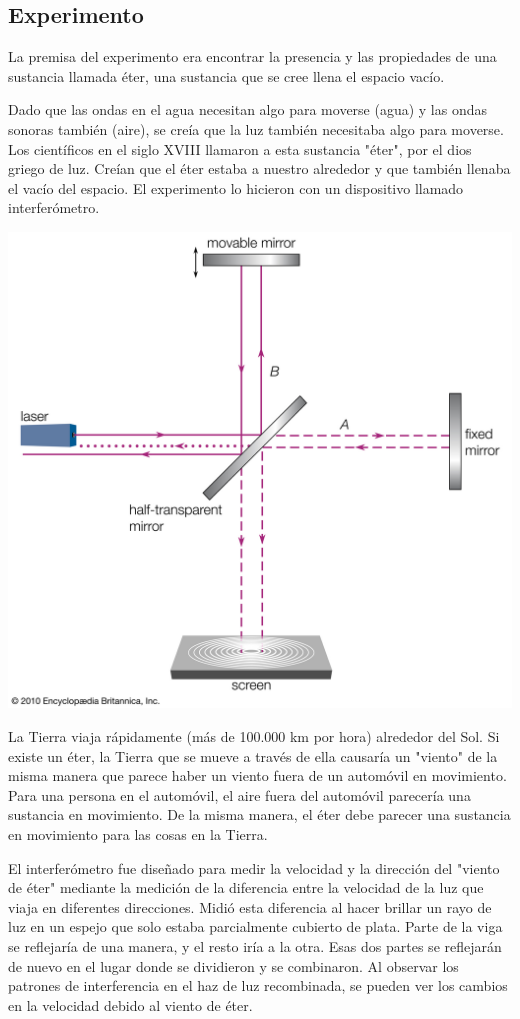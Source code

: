 \documentclass[letterpaper, 10pt, journal]{IEEEtran}
\begin{document}
\subsection{Experimento}
La premisa del experimento era encontrar la presencia y las propiedades de una sustancia llamada éter, una sustancia que se cree llena el espacio vacío. 

Dado que las ondas en el agua necesitan algo para moverse (agua) y las ondas sonoras también (aire), se creía que la luz también necesitaba algo para moverse. Los científicos en el siglo XVIII llamaron a esta sustancia "éter", por el dios griego de luz. Creían que el éter estaba a nuestro alrededor y que también llenaba el vacío del espacio. El experimento lo hicieron con un dispositivo llamado interferómetro.

\includegraphics[scale=0.15]{luz}

La Tierra viaja rápidamente (más de 100.000 km por hora) alrededor del Sol. Si existe un éter, la Tierra que se mueve a través de ella causaría un "viento" de la misma manera que parece haber un viento fuera de un automóvil en movimiento. Para una persona en el automóvil, el aire fuera del automóvil parecería una sustancia en movimiento. De la misma manera, el éter debe parecer una sustancia en movimiento para las cosas en la Tierra.

El interferómetro fue diseñado para medir la velocidad y la dirección del "viento de éter" mediante la medición de la diferencia entre la velocidad de la luz que viaja en diferentes direcciones. Midió esta diferencia al hacer brillar un rayo de luz en un espejo que solo estaba parcialmente cubierto de plata. Parte de la viga se reflejaría de una manera, y el resto iría a la otra. Esas dos partes se reflejarán de nuevo en el lugar donde se dividieron y se combinaron. Al observar los patrones de interferencia en el haz de luz recombinada, se pueden ver los cambios en la velocidad debido al viento de éter.
\end{document}
